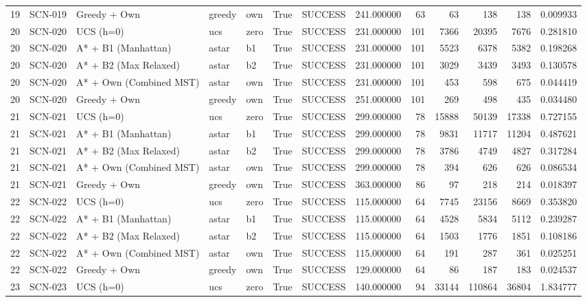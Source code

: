 \begin{table}[htbp]
\begin{tabular}{rllllrlrrrrrr}
19 & SCN-019 & Greedy + Own & greedy & own & True & SUCCESS & 241.000000 & 63 & 63 & 138 & 138 & 0.009933 \\
20 & SCN-020 & UCS (h=0) & ucs & zero & True & SUCCESS & 231.000000 & 101 & 7366 & 20395 & 7676 & 0.281810 \\
20 & SCN-020 & A* + B1 (Manhattan) & astar & b1 & True & SUCCESS & 231.000000 & 101 & 5523 & 6378 & 5382 & 0.198268 \\
20 & SCN-020 & A* + B2 (Max Relaxed) & astar & b2 & True & SUCCESS & 231.000000 & 101 & 3029 & 3439 & 3493 & 0.130578 \\
20 & SCN-020 & A* + Own (Combined MST) & astar & own & True & SUCCESS & 231.000000 & 101 & 453 & 598 & 675 & 0.044419 \\
20 & SCN-020 & Greedy + Own & greedy & own & True & SUCCESS & 251.000000 & 101 & 269 & 498 & 435 & 0.034480 \\
21 & SCN-021 & UCS (h=0) & ucs & zero & True & SUCCESS & 299.000000 & 78 & 15888 & 50139 & 17338 & 0.727155 \\
21 & SCN-021 & A* + B1 (Manhattan) & astar & b1 & True & SUCCESS & 299.000000 & 78 & 9831 & 11717 & 11204 & 0.487621 \\
21 & SCN-021 & A* + B2 (Max Relaxed) & astar & b2 & True & SUCCESS & 299.000000 & 78 & 3786 & 4749 & 4827 & 0.317284 \\
21 & SCN-021 & A* + Own (Combined MST) & astar & own & True & SUCCESS & 299.000000 & 78 & 394 & 626 & 626 & 0.086534 \\
21 & SCN-021 & Greedy + Own & greedy & own & True & SUCCESS & 363.000000 & 86 & 97 & 218 & 214 & 0.018397 \\
22 & SCN-022 & UCS (h=0) & ucs & zero & True & SUCCESS & 115.000000 & 64 & 7745 & 23156 & 8669 & 0.353820 \\
22 & SCN-022 & A* + B1 (Manhattan) & astar & b1 & True & SUCCESS & 115.000000 & 64 & 4528 & 5834 & 5112 & 0.239287 \\
22 & SCN-022 & A* + B2 (Max Relaxed) & astar & b2 & True & SUCCESS & 115.000000 & 64 & 1503 & 1776 & 1851 & 0.108186 \\
22 & SCN-022 & A* + Own (Combined MST) & astar & own & True & SUCCESS & 115.000000 & 64 & 191 & 287 & 361 & 0.025251 \\
22 & SCN-022 & Greedy + Own & greedy & own & True & SUCCESS & 129.000000 & 64 & 86 & 187 & 183 & 0.024537 \\
23 & SCN-023 & UCS (h=0) & ucs & zero & True & SUCCESS & 140.000000 & 94 & 33144 & 110864 & 36804 & 1.834777 \\

\end{tabular}
\end{table}

